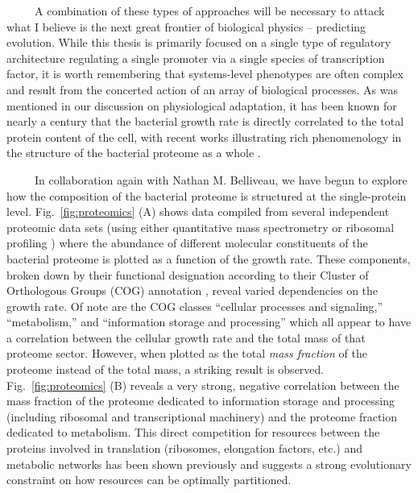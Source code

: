 \documentclass[12pt]{caltech_thesis}
\begin{document}
~~~~~A combination of these types of approaches will be necessary to
attack what I believe is the next great frontier of biological physics
-- predicting evolution. While this thesis is primarily focused on a
single type of regulatory architecture regulating a single promoter via
a single species of transcription factor, it is worth remembering that
systems-level phenotypes are often complex and result from the concerted
action of an array of biological processes. As was mentioned in our
discussion on physiological adaptation, it has been known for nearly a
century that the bacterial growth rate is directly correlated to the
total protein content of the cell, with recent works illustrating rich
phenomenology in the structure of the bacterial proteome as a whole
\autocite{li2014,schmidt2016,hui2015,scott2010,klumpp2014}.

~~~~~In collaboration again with Nathan M. Belliveau, we have begun to
explore how the composition of the bacterial proteome is structured at
the single-protein level. Fig.~\ref{fig:proteomics} (A) shows data
compiled from several independent proteomic data sets (using either
quantitative mass spectrometry
\autocite{schmidt2016,peebo2015,valgepea2013} or ribosomal profiling
\autocite{li2014}) where the abundance of different molecular
constituents of the bacterial proteome is plotted as a function of the
growth rate. These components, broken down by their functional
designation according to their Cluster of Orthologous Groups (COG)
annotation \autocite{galperin2015}, reveal varied dependencies on the
growth rate. Of note are the COG classes ``cellular processes and
signaling,'' ``metabolism,'' and ``information storage and processing''
which all appear to have a correlation between the cellular growth rate
and the total mass of that proteome sector. However, when plotted as the
total \emph{mass fraction} of the proteome instead of the total mass, a
striking result is observed. Fig.~\ref{fig:proteomics} (B) reveals a
very strong, negative correlation between the mass fraction of the
proteome dedicated to information storage and processing (including
ribosomal and transcriptional machinery) and the proteome fraction
dedicated to metabolism. This direct competition for resources between
the proteins involved in translation (ribosomes, elongation factors,
etc.) and metabolic networks has been shown previously
\autocite{klumpp2008,scott2010,hui2015} and suggests a strong
evolutionary constraint on how resources can be optimally partitioned.
\end{document}
